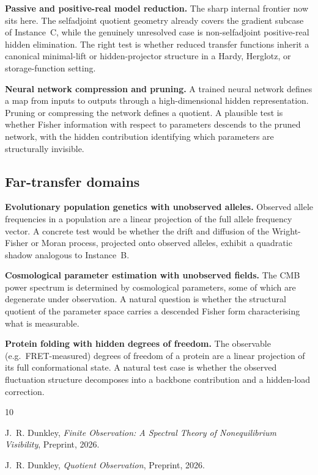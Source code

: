 \documentclass[11pt,a4paper]{article}
\numberwithin{equation}{section}
\theoremstyle{thmcompact}
\theoremstyle{remark}
\begin{document}
\textbf{Passive and positive-real model reduction.} The sharp internal frontier now sits here. The selfadjoint quotient geometry already covers the gradient subcase of Instance~C, while the genuinely unresolved case is non-selfadjoint positive-real hidden elimination. The right test is whether reduced transfer functions inherit a canonical minimal-lift or hidden-projector structure in a Hardy, Herglotz, or storage-function setting.

\textbf{Neural network compression and pruning.} A trained neural network defines a map from inputs to outputs through a high-dimensional hidden representation. Pruning or compressing the network defines a quotient. A plausible test is whether Fisher information with respect to parameters descends to the pruned network, with the hidden contribution identifying which parameters are structurally invisible.

\subsection{Far-transfer domains}

\textbf{Evolutionary population genetics with unobserved alleles.} Observed allele frequencies in a population are a linear projection of the full allele frequency vector. A concrete test would be whether the drift and diffusion of the Wright-Fisher or Moran process, projected onto observed alleles, exhibit a quadratic shadow analogous to Instance~B.

\textbf{Cosmological parameter estimation with unobserved fields.} The CMB power spectrum is determined by cosmological parameters, some of which are degenerate under observation. A natural question is whether the structural quotient of the parameter space carries a descended Fisher form characterising what is measurable.

\textbf{Protein folding with hidden degrees of freedom.} The observable (e.g.\ FRET-measured) degrees of freedom of a protein are a linear projection of its full conformational state. A natural test case is whether the observed fluctuation structure decomposes into a backbone contribution and a hidden-load correction.

\begin{thebibliography}{10}

J.~R. Dunkley,
\emph{Finite Observation: A Spectral Theory of Nonequilibrium Visibility},
Preprint, 2026.

J.~R. Dunkley,
\emph{Quotient Observation},
Preprint, 2026.

\end{thebibliography}
\end{document}
